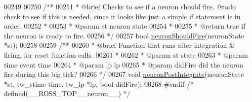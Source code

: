 \begin{DoxyCode}
00249 
00250 \textcolor{comment}{/**}
00251 \textcolor{comment}{ *  @brief  Checks to see if a neuron should fire. @todo check to see if this is needed, since it
       looks like just a simple if statement is in order.}
00252 \textcolor{comment}{ *}
00253 \textcolor{comment}{ *  @param st neuron state}
00254 \textcolor{comment}{ *}
00255 \textcolor{comment}{ *  @return true if the neuron is ready to fire.}
00256 \textcolor{comment}{ */}
00257 \textcolor{keywordtype}{bool} \hyperlink{neuron_8h_a92d5882a15e11e2a6733483d51428e46}{neuronShouldFire}(neuronState *st);
00258 
00259 \textcolor{comment}{/**}
00260 \textcolor{comment}{ *  @brief  Function that runs after integration & firing, for reset function calls.}
00261 \textcolor{comment}{ *}
00262 \textcolor{comment}{ *  @param st      state}
00263 \textcolor{comment}{ *  @param time    event time}
00264 \textcolor{comment}{ *  @param lp      lp}
00265 \textcolor{comment}{ *  @param didFire did the neuron fire during this big tick?}
00266 \textcolor{comment}{ */}
00267 \textcolor{keywordtype}{void} \hyperlink{neuron_8h_adadd3095c39786607629697406f3d1eb}{neuronPostIntegrate}(neuronState *st, tw\_stime time, tw\_lp *lp, \textcolor{keywordtype}{bool} didFire);
00268 \textcolor{preprocessor}{#}\textcolor{preprocessor}{endif} \textcolor{comment}{/* defined(\_\_ROSS\_TOP\_\_neuron\_\_) */}
\end{DoxyCode}
